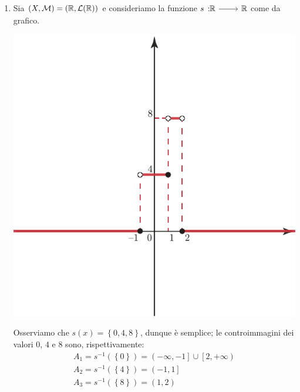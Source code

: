 \begin{examples}~{} \label{funzionesemplice}
	\begin{enumerate}
		\item Sia $\left(X,\mathcal{M}\right)=\left(\mathbb{R},\mathcal{L}(\mathbb{R})\right)$ e consideriamo la funzione $\funz{s}{\realset}{\realset}$ come da grafico.\\
		\begin{minipage}{0.4\textwidth}
			\includegraphics[trim=3cm 2cm 0cm 0cm, clip, scale=0.7]{images/graficosemplice.pdf}
		\end{minipage}\hspace{-7mm}
		\begin{minipage}{0.55\textwidth}
			Osserviamo che $s(x)=\left\{0,4,8\right\}$, dunque è semplice; le controimmagini dei valori $0$, $4$ e $8$ sono, rispettivamente:
			\begin{equation*}
				\begin{array}{l}
					A_1=s^{-1}\left(\left\{0\right\}\right)=\left(-\infty,-1\right]\cup\left[2,+\infty\right)\\
					A_2=s^{-1}\left(\left\{4\right\}\right)=\left(-1,1\right]\\
					A_3=s^{-1}\left(\left\{8\right\}\right)=\left(1,2\right)
				\end{array}
			\end{equation*}

\end{minipage}
\end{enumerate}
\end{examples}
